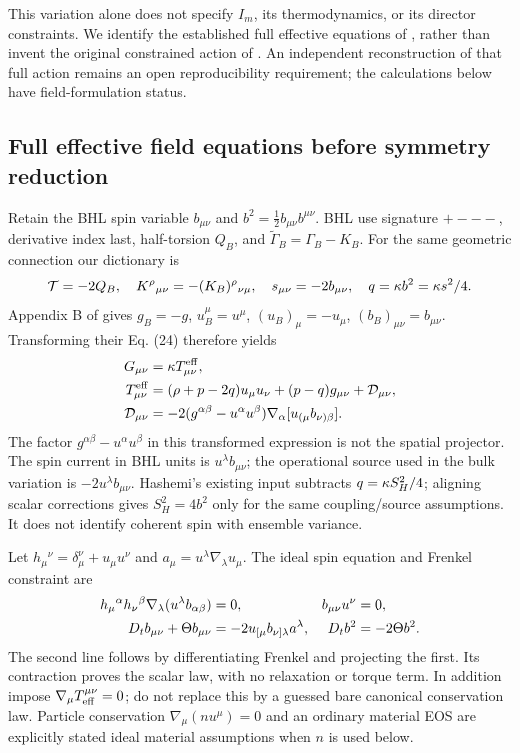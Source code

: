 This variation alone does not specify $I_m$, its thermodynamics, or its director constraints. We identify the established full effective equations of \cite{BHL}, rather than invent the original constrained action of \cite{OK}. An independent reconstruction of that full action remains an open reproducibility requirement; the calculations below have field-formulation status.

\subsection{Full effective field equations before symmetry reduction}
Retain the BHL spin variable $b_{\mu\nu}$ and $b^2=\tfrac12b_{\mu\nu}b^{\mu\nu}$. BHL use signature $+---$, derivative index last, half-torsion $Q_B$, and $\widetilde\Gamma_B=\Gamma_B-K_B$. For the same geometric connection our dictionary is
\begin{equation}
 \mathcal T=-2Q_B,\quad K^\rho{}_{\mu\nu}=-(K_B)^\rho{}_{\nu\mu},\quad s_{\mu\nu}=-2b_{\mu\nu},\quad
 q=\kappa b^2=\kappa s^2/4.
\end{equation}
Appendix B of \cite{BHL} gives $g_B=-g$, $u_B^\mu=u^\mu$, $(u_B)_\mu=-u_\mu$, $(b_B)_{\mu\nu}=b_{\mu\nu}$. Transforming their Eq. (24) therefore yields
\begin{align}
 G_{\mu\nu}&=\kappa T^{\rm eff}_{\mu\nu},\label{eq:fullEFE}\\
 T^{\rm eff}_{\mu\nu}&=(\rho+p-2q)u_\mu u_\nu+(p-q)g_{\mu\nu}+\mathcal D_{\mu\nu},\label{eq:fullT}\\
 \mathcal D_{\mu\nu}&=-2(g^{\alpha\beta}-u^\alpha u^\beta)\nabla_\alpha[u_{(\mu}b_{\nu)\beta}].\label{eq:D}
\end{align}
The factor $g^{\alpha\beta}-u^\alpha u^\beta$ in this transformed expression is not the spatial projector. The spin current in BHL units is $u^\lambda b_{\mu\nu}$; the operational source used in the bulk variation is $-2u^\lambda b_{\mu\nu}$. Hashemi's existing input subtracts $q=\kappa S_H^2/4$; aligning scalar corrections gives $S_H^2=4b^2$ only for the same coupling/source assumptions. It does not identify coherent spin with ensemble variance.

Let $h_\mu{}^\nu=\delta_\mu^\nu+u_\mu u^\nu$ and $a_\mu=u^\lambda\nabla_\lambda u_\mu$. The ideal spin equation and Frenkel constraint are
\begin{align}
 h_\mu{}^\alpha h_\nu{}^\beta\nabla_\lambda(u^\lambda b_{\alpha\beta})&=0,
 &b_{\mu\nu}u^\nu&=0,\label{eq:spinproject}\\
 D_t b_{\mu\nu}+\Theta b_{\mu\nu}&=-2u_{[\mu}b_{\nu]\lambda}a^\lambda,
 &D_t b^2&=-2\Theta b^2.\label{eq:spintransport}
\end{align}
The second line follows by differentiating Frenkel and projecting the first. Its contraction proves the scalar law, with no relaxation or torque term. In addition impose $\nabla_\mu T^{\mu\nu}_{\rm eff}=0$; do not replace this by a guessed bare canonical conservation law. Particle conservation $\nabla_\mu(nu^\mu)=0$ and an ordinary material EOS are explicitly stated ideal material assumptions when $n$ is used below.
